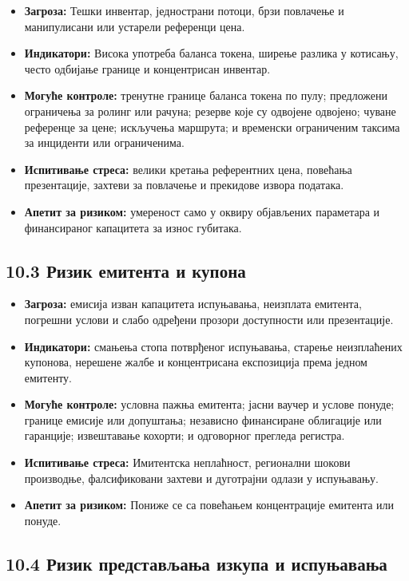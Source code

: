 \documentclass[11pt]{article}
\begin{document}
\begin{itemize}[leftmargin=*]
\item \textbf{Загроза:} Тешки инвентар, једнострани потоци, брзи повлачење и манипулисани или устарели референци цена.
\item \textbf{Индикатори:} Висока употреба баланса токена, ширење разлика у котисању, често одбијање границе и концентрисан инвентар.
\item \textbf{Могуће контроле:} тренутне границе баланса токена по пулу; предложени ограничења за ролинг или рачуна; резерве које су одвојене одвојено; чуване референце за цене; искључења маршрута; и временски ограниченим таксима за инциденти или ограниченима.
\item \textbf{Испитивање стреса:} велики кретања референтних цена, повећања презентације, захтеви за повлачење и прекидове извора података.
\item \textbf{Апетит за ризиком:} умереност само у оквиру објављених параметара и финансираног капацитета за износ губитака.
\end{itemize}
\subsection*{10.3 Ризик емитента и купона}

\begin{itemize}[leftmargin=*]
\item \textbf{Загроза:} емисија изван капацитета испуњавања, неизплата емитента, погрешни услови и слабо одређени прозори доступности или презентације.
\item \textbf{Индикатори:} смањења стопа потврђеног испуњавања, старење неизплаћених купонова, нерешене жалбе и концентрисана експозиција према једном емитенту.
\item \textbf{Могуће контроле:} условна пажња емитента; јасни ваучер и услове понуде; границе емисије или допуштања; независно финансиране облигације или гаранције; извештавање кохорти; и одговорног прегледа регистра.
\item \textbf{Испитивање стреса:} Имитентска неплаћност, регионални шокови производње, фалсификовани захтеви и дуготрајни одлази у испуњавању.
\item \textbf{Апетит за ризиком:} Пониже се са повећањем концентрације емитента или понуде.
\end{itemize}
\subsection*{10.4 Ризик представљања изкупа и испуњавања}
\end{document}

